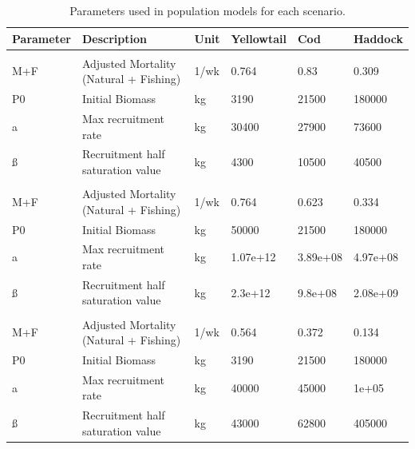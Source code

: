 \documentclass[
  12pt,
]{article}
\begin{document}
\begin{table}

\caption{\label{tab:paramsSCENARIOS}Parameters used in population models for each scenario.}
\centering
\fontsize{10}{12}\selectfont
\begin{tabular}[t]{llllll}
\toprule
Parameter & Description & Unit & Yellowtail & Cod & Haddock\\
\midrule
\addlinespace[0.3em]
\multicolumn{1}{l}{\textbf{Constant Population}}\\
\hspace{1em}M+F & Adjusted Mortality (Natural + Fishing) & 1/wk & 0.764 & 0.83 & 0.309\\
\hspace{1em}P0 & Initial Biomass & kg & 3190 & 21500 & \vphantom{1} 180000\\
\hspace{1em}a & Max recruitment rate & kg & 30400 & 27900 & 73600\\
\hspace{1em}ß & Recruitment half saturation value & kg & 4300 & 10500 & 40500\\
\addlinespace[0.3em]
\multicolumn{1}{l}{\textbf{Decreasing Population}}\\
\hspace{1em}M+F & Adjusted Mortality (Natural + Fishing) & 1/wk & 0.764 & 0.623 & 0.334\\
\hspace{1em}P0 & Initial Biomass & kg & 50000 & 21500 & 180000\\
\hspace{1em}a & Max recruitment rate & kg & 1.07e+12 & 3.89e+08 & 4.97e+08\\
\hspace{1em}ß & Recruitment half saturation value & kg & 2.3e+12 & 9.8e+08 & 2.08e+09\\
\addlinespace[0.3em]
\multicolumn{1}{l}{\textbf{Increasing Population}}\\
\hspace{1em}M+F & Adjusted Mortality (Natural + Fishing) & 1/wk & 0.564 & 0.372 & 0.134\\
\hspace{1em}P0 & Initial Biomass & kg & 3190 & 21500 & 180000\\
\hspace{1em}a & Max recruitment rate & kg & 40000 & 45000 & 1e+05\\
\hspace{1em}ß & Recruitment half saturation value & kg & 43000 & 62800 & 405000\\
\bottomrule
\end{tabular}
\end{table}
\end{document}

